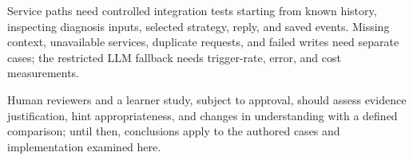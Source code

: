 Service paths need controlled integration tests starting from known history, inspecting diagnosis inputs, selected strategy, reply, and saved events. Missing context, unavailable services, duplicate requests, and failed writes need separate cases; the restricted LLM fallback needs trigger-rate, error, and cost measurements.

Human reviewers and a learner study, subject to approval, should assess evidence justification, hint appropriateness, and changes in understanding with a defined comparison; until then, conclusions apply to the authored cases and implementation examined here.
